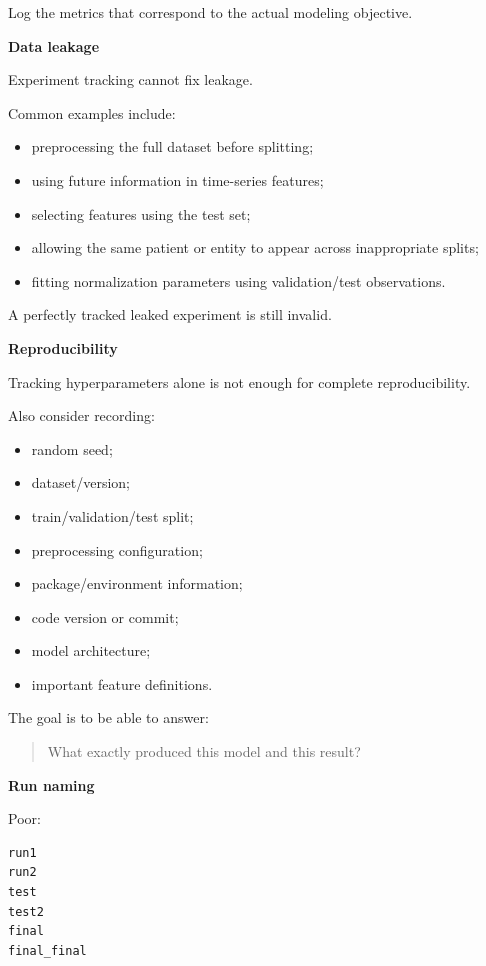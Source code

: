 \documentclass[11pt,letterpaper]{article}
\begin{document}
Log the metrics that correspond to the actual modeling objective.

\textbf{Data leakage}

Experiment tracking cannot fix leakage.

Common examples include:

\begin{itemize}[leftmargin=*]
    \item preprocessing the full dataset before splitting;
    \item using future information in time-series features;
    \item selecting features using the test set;
    \item allowing the same patient or entity to appear across inappropriate splits;
    \item fitting normalization parameters using validation/test observations.
\end{itemize}

A perfectly tracked leaked experiment is still invalid.

\textbf{Reproducibility}

Tracking hyperparameters alone is not enough for complete reproducibility.

Also consider recording:

\begin{itemize}[leftmargin=*]
    \item random seed;
    \item dataset/version;
    \item train/validation/test split;
    \item preprocessing configuration;
    \item package/environment information;
    \item code version or commit;
    \item model architecture;
    \item important feature definitions.
\end{itemize}

The goal is to be able to answer:

\begin{quote}
What exactly produced this model and this result?
\end{quote}

\textbf{Run naming}

Poor:

\begin{lstlisting}
run1
run2
test
test2
final
final_final
\end{lstlisting}
\end{document}
